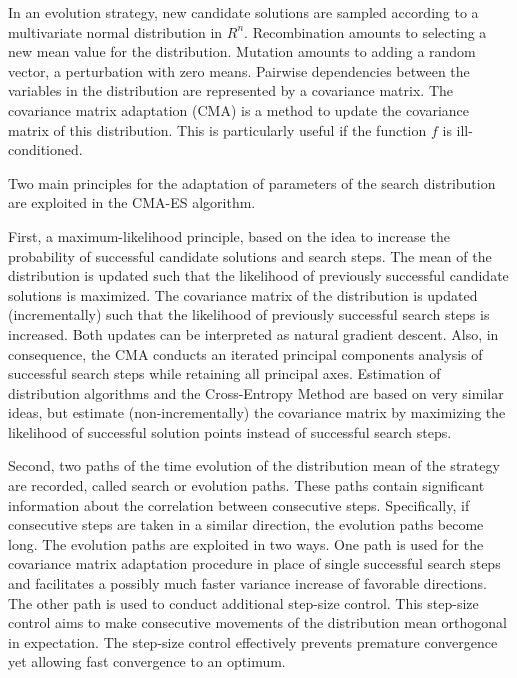 In an evolution strategy, new candidate solutions are sampled according to a multivariate normal distribution in ${R}^{n}$. Recombination amounts to selecting a new mean value for the distribution. Mutation amounts to adding a random vector, a perturbation with zero means. Pairwise dependencies between the variables in the distribution are represented by a covariance matrix. The covariance matrix adaptation (CMA) is a method to update the covariance matrix of this distribution. This is particularly useful if the function $f$ is ill-conditioned.

Two main principles for the adaptation of parameters of the search distribution are exploited in the CMA-ES algorithm.

First, a maximum-likelihood principle, based on the idea to increase the probability of successful candidate solutions and search steps. The mean of the distribution is updated such that the likelihood of previously successful candidate solutions is maximized. The covariance matrix of the distribution is updated (incrementally) such that the likelihood of previously successful search steps is increased. Both updates can be interpreted as natural gradient descent. Also, in consequence, the CMA conducts an iterated principal components analysis of successful search steps while retaining all principal axes. Estimation of distribution algorithms and the Cross-Entropy Method are based on very similar ideas, but estimate (non-incrementally) the covariance matrix by maximizing the likelihood of successful solution points instead of successful search steps.

Second, two paths of the time evolution of the distribution mean of the strategy are recorded, called search or evolution paths. These paths contain significant information about the correlation between consecutive steps. Specifically, if consecutive steps are taken in a similar direction, the evolution paths become long. The evolution paths are exploited in two ways. One path is used for the covariance matrix adaptation procedure in place of single successful search steps and facilitates a possibly much faster variance increase of favorable directions. The other path is used to conduct additional step-size control. This step-size control aims to make consecutive movements of the distribution mean orthogonal in expectation. The step-size control effectively prevents premature convergence yet allowing fast convergence to an optimum.

